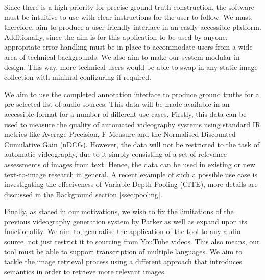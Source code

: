 \documentclass{l4proj}
\begin{document}
Since there is a high priority for precise ground truth construction, the software must be intuitive to use with clear instructions for the user to follow. We must, therefore, aim to produce a user-friendly interface in an easily accessible platform. Additionally, since the aim is for this application to be used by anyone, appropriate error handling must be in place to accommodate users from a wide area of technical backgrounds. We also aim to make our system modular in design. This way, more technical users would be able to swap in any static image collection with minimal configuring if required.

We aim to use the completed annotation interface to produce ground truths for a pre-selected list of audio sources. This data will be made available in an accessible format for a number of different use cases. Firstly, this data can be used to measure the quality of automated videography systems using standard IR metrics like Average Precision, F-Measure and the Normalised Discounted Cumulative Gain (nDCG). However, the data will not be restricted to the task of automatic videography, due to it simply consisting of a set of relevance assessments of images from text. Hence, the data can be used in existing or new text-to-image research in general. A recent example of such a possible use case is investigating the effeciveness of Variable Depth Pooling (CITE), more details are discussed in the Background section \ref{ssec:pooling}.

Finally, as stated in our motivations, we wish to fix the limitations of the previous videography generation system by Parker as well as expand upon its functionality. We aim to, generalise the application of the tool to any audio source, not just restrict it to sourcing from YouTube videos. This also means, our tool must be able to support transcription of multiple languages. We aim to tackle the image retrieval process using a different approach that introduces semantics in order to retrieve more relevant images.



\end{document}
